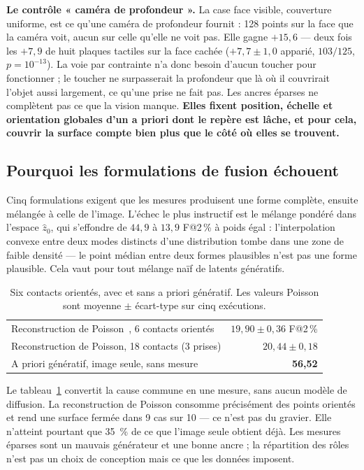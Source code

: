 \documentclass[conference]{IEEEtran}
\makeatletter
\newcommand{\gd}[1]{\textbf{#1}}
\newcommand{\Fs}{F@2\,\%}
\makeatother
\begin{document}
\textbf{Le contrôle « caméra de profondeur ».} La case face visible, couverture
uniforme, est ce qu'une caméra de profondeur fournit : 128 points sur la face que la
caméra voit, aucun sur celle qu'elle ne voit pas. Elle gagne $+15{,}6$ --- deux fois les
$+7{,}9$ de huit plaques tactiles sur la face cachée ($+7{,}7 \pm 1{,}0$ apparié,
$103/125$, $p = 10^{-13}$). La voie par contrainte n'a donc besoin d'aucun toucher pour
fonctionner ; le toucher ne surpasserait la profondeur que là où il couvrirait l'objet
aussi largement, ce qu'une prise ne fait pas. Les ancres éparses ne complètent pas ce
que la vision manque. \textbf{Elles fixent position, échelle et orientation globales
d'un a priori dont le repère est lâche, et pour cela, couvrir la surface compte bien
plus que le côté où elles se trouvent.}

\subsection{Pourquoi les formulations de fusion échouent}
\label{sec:fusions}

Cinq formulations exigent que les mesures produisent une forme complète, ensuite
mélangée à celle de l'image. L'échec le plus instructif est le mélange pondéré dans
l'espace $\hat{z}_0$, qui s'effondre de $44{,}9$ à $13{,}9$ \Fs{} à poids égal :
l'interpolation convexe entre deux modes distincts d'une distribution tombe dans une
zone de faible densité --- le point médian entre deux formes plausibles n'est pas une
forme plausible. Cela vaut pour tout mélange naïf de latents génératifs.

\begin{table}[t]
\centering
\caption{Six contacts orientés, avec et sans a priori génératif. Les valeurs Poisson sont moyenne $\pm$ écart-type sur cinq exécutions.}
\label{tab:poisson}
\begin{tabular}{lr}
\toprule
Reconstruction de Poisson~\cite{poisson}, 6 contacts orientés & $19{,}90 \pm 0{,}36$ \Fs \\
Reconstruction de Poisson, 18 contacts (3 prises) & $20{,}44 \pm 0{,}18$ \\
\midrule
A priori génératif, image seule, sans mesure & \gd{56,52} \\
\bottomrule
\end{tabular}
\end{table}

Le tableau~\ref{tab:poisson} convertit la cause commune en une mesure, sans aucun
modèle de diffusion. La reconstruction de Poisson consomme précisément des points
orientés et rend une surface fermée dans 9 cas sur 10 --- ce n'est pas du gravier.
Elle n'atteint pourtant que 35~\% de ce que l'image seule obtient déjà. Les mesures
éparses sont un mauvais générateur et une bonne ancre ; la répartition des rôles n'est
pas un choix de conception mais ce que les données imposent.
\end{document}
